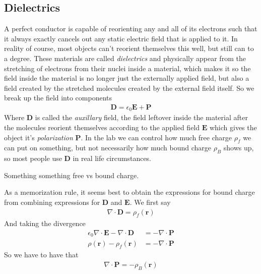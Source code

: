 \subsection{Dielectrics}
A perfect conductor is capable of reorienting any and all of its electrons such that it always exactly cancels out any static electric field that is applied to it. In reality of course, most objects can't reorient themselves this well, but still can to a degree. These materials are called \emph{dielectrics} and physically appear from the stretching of electrons from their nuclei inside a material, which makes it so the field inside the material is no longer just the externally applied field, but also a field created by the stretched molecules created by the external field itself. So we break up the field into components
\begin{align}
\textbf{D} = \epsilon_0\textbf{E} + \textbf{P}
\end{align}
Where $\textbf{D}$ is called the \emph{auxillary} field, the field leftover inside the material after the molecules reorient themselves according to the applied field $\textbf{E}$ which gives the object it's \emph{polarization} $\textbf{P}$. In the lab we can control how much free charge  $\rho_f$ we can put on something, but not necessarily how much bound charge $\rho_B$ shows up, so most people use $\textbf{D}$ in real life circumstances.


Something something free vs bound charge.


 As a memorization rule, it seems best to obtain the expressions for bound charge from combining expressions for $\textbf{D}$ and $\textbf{E}$. We first say
\begin{align}
\nabla\cdot\textbf{D} = \rho_f(\textbf{r})
\end{align}
And taking the divergence
\begin{align}
\epsilon_0\nabla\cdot\textbf{E} - \nabla\cdot\textbf{D} &=  -\nabla\cdot \textbf{P}\\
\rho(\textbf{r})  - \rho_f(\textbf{r}) &= -\nabla\cdot \textbf{P}
\end{align}
So we have to have that
\begin{align}
\nabla\cdot \textbf{P} = -\rho_B(\textbf{r})
\end{align}


